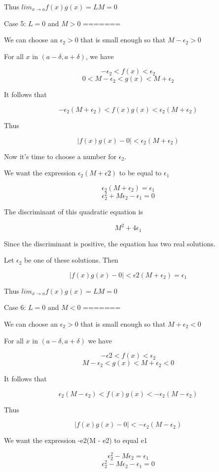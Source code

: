 Thus $lim_{x \rightarrow a} f(x)g(x) = LM = 0$

Case 5: $L = 0$ and $M > 0$
=======

We can choose an $\epsilon_2 > 0$ that is small enough so that $M - \epsilon_2 > 0$

For all $x$ in $(a - \delta, a + \delta)$, we have

    $$ -\epsilon_2 < f(x) < \epsilon_2 $$
    $$ 0 < M - \epsilon_2 < g(x) < M + \epsilon_2 $$

It follows that

    $$ -\epsilon_2(M + \epsilon_2) < f(x)g(x) < \epsilon_2(M + \epsilon_2) $$

Thus

    $$ |f(x)g(x) - 0| < \epsilon_2(M + \epsilon_2) $$

Now it's time to choose a number for $\epsilon_2$.

We want the expression $\epsilon_2(M + \epsilon2)$ to be equal to $\epsilon_1$

    $$ \epsilon_2(M + \epsilon_2) = \epsilon_1 $$
    $$ \epsilon_2^2 + M\epsilon_2 - \epsilon_1 = 0 $$

The discriminant of this quadratic equation is

    $$ M^2 + 4\epsilon_1 $$

Since the discriminant is positive, the equation has two real solutions.

Let $\epsilon_2$ be one of these solutions. Then 

    $$ |f(x)g(x) - 0| < \epsilon2(M + \epsilon_2) = \epsilon_1 $$

Thus $lim_{x \rightarrow a} f(x)g(x) = LM = 0 $

Case 6: $L = 0$ and $M < 0$
=======

We can choose an $\epsilon_2 > 0$ that is small enough so that $M + \epsilon_2 < 0$

For all $x$ in $(a - \delta, a + \delta)$ we have

    $$ -\epsilon2 < f(x) < \epsilon_2 $$
    $$ M - \epsilon_2 < g(x) < M + \epsilon_2 < 0 $$

It follows that

    $$ \epsilon_2(M - \epsilon_2) < f(x)g(x) < -\epsilon_2(M - \epsilon_2) $$

Thus

    $$ |f(x)g(x) - 0| < -\epsilon_2(M - \epsilon_2) $$

We want the expression -e2(M - e2) to equal e1

    $$ \epsilon_2^2 - M\epsilon_2 = \epsilon_1 $$
    $$ \epsilon_2^2 - M\epsilon_2 - \epsilon_1 = 0 $$

